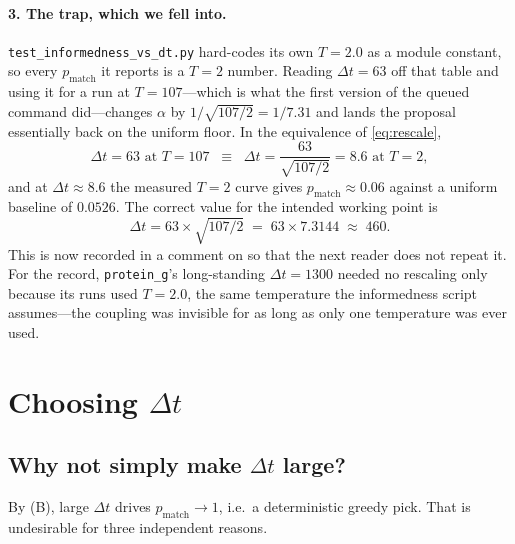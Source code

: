 \documentclass[11pt,a4paper]{article}
\newcommand{\dt}{\Delta t}
\newcommand{\pmatch}{p_{\mathrm{match}}}
\begin{document}
\paragraph{3. The trap, which we fell into.}
\texttt{test\_informedness\_vs\_dt.py} hard-codes its own $T=2.0$ as a module
constant, so every $\pmatch$ it reports is a $T\!=\!2$ number. Reading
$\dt=63$ off that table and using it for a run at $T=107$---which is what the
first version of the queued command did---changes $\alpha$ by
$1/\sqrt{107/2} = 1/7.31$ and lands the proposal essentially back on the
uniform floor. In the equivalence of \eqref{eq:rescale},
\begin{equation}
  \dt=63 \text{ at } T=107
  \;\;\equiv\;\;
  \dt = \frac{63}{\sqrt{107/2}} = 8.6 \text{ at } T=2,
\end{equation}
and at $\dt\!\approx\!8.6$ the measured $T\!=\!2$ curve gives
$\pmatch \approx 0.06$ against a uniform baseline of $0.0526$. The correct
value for the intended working point is
\begin{equation}
  \dt = 63 \times \sqrt{107/2} \;=\; 63 \times 7.3144 \;\approx\; 460 .
\end{equation}
This is now recorded in a comment on  so that the next
reader does not repeat it. For the record, \texttt{protein\_g}'s long-standing
$\dt=1300$ needed no rescaling only because its runs used $T=2.0$, the same
temperature the informedness script assumes---the coupling was invisible for
as long as only one temperature was ever used.

\section{\texorpdfstring{Choosing $\dt$}{Choosing dt}}

\subsection{\texorpdfstring{Why not simply make $\dt$ large?}{Why not simply make dt large?}}

By (B), large $\dt$ drives $\pmatch \to 1$, i.e.\ a deterministic greedy pick.
That is undesirable for three independent reasons.
\end{document}
